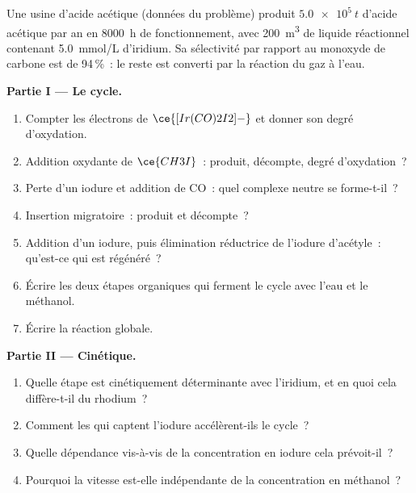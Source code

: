 \begin{problem}
\label{pb:b3:homogeneous-catalysis:1}
Une usine d'acide acétique (données du problème) produit $\qty{5.0e5}{t}$ d'acide acétique par an
en \qty{8000}{h} de fonctionnement, avec \qty{200}{m^3} de liquide réactionnel contenant \qty{5.0}{mmol/L}
d'iridium. Sa sélectivité par rapport au monoxyde de carbone est de
94\,\%~: le reste est converti par la réaction du gaz à l'eau.

\medskip\noindent\textbf{Partie I --- Le cycle.}
\begin{enumerate}
  \item Compter les électrons de $\ce{[Ir(CO)2I2]-}$ et donner son degré d'oxydation.
  \item Addition oxydante de $\ce{CH3I}$~: produit, décompte, degré d'oxydation~?
  \item Perte d'un iodure et addition de CO~: quel complexe neutre se
        forme-t-il~?
  \item Insertion migratoire~: produit et décompte~?
  \item Addition d'un iodure, puis élimination réductrice de l'iodure
        d'acétyle~: qu'est-ce qui est régénéré~?
  \item Écrire les deux étapes organiques qui ferment le cycle avec l'eau
        et le méthanol.
  \item Écrire la réaction globale.
\end{enumerate}

\medskip\noindent\textbf{Partie II --- Cinétique.}
\begin{enumerate}[resume]
  \item Quelle étape est cinétiquement déterminante avec l'iridium, et en
        quoi cela diffère-t-il du rhodium~?
  \item Comment les  qui captent l'iodure accélèrent-ils le
        cycle~?
  \item Quelle dépendance vis-à-vis de la concentration en iodure cela
        prévoit-il~?
  \item Pourquoi la vitesse est-elle indépendante de la concentration en
        méthanol~?
\end{enumerate}


\end{problem}
